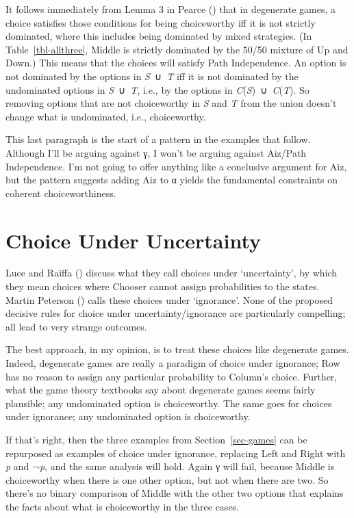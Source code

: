 \documentclass[
  11pt,
  letterpaper,
  DIV=11,
  numbers=noendperiod,
  twoside]{scrartcl}
\begin{document}
It follows immediately from Lemma 3 in Pearce
() that in degenerate games, a choice
satisfies those conditions for being choiceworthy iff it is not strictly
dominated, where this includes being dominated by mixed strategies. (In
Table~\ref{tbl-allthree}, Middle is strictly dominated by the 50/50
mixture of Up and Down.) This means that the choices will satisfy Path
Independence. An option is not dominated by the options in
\emph{S}~∪~\emph{T} iff it is not dominated by the undominated options
in \emph{S}~∪~\emph{T}, i.e., by the options in
\emph{C}(\emph{S})~∪~\emph{C}(\emph{T}). So removing options that are
not choiceworthy in \emph{S} and \emph{T} from the union doesn't change
what is undominated, i.e., choiceworthy.

This last paragraph is the start of a pattern in the examples that
follow. Although I'll be arguing against γ, I won't be arguing against
Aiz/Path Independence. I'm not going to offer anything like a conclusive
argument for Aiz, but the pattern suggests adding Aiz to α yields the
fundamental constraints on coherent choiceworthiness.

\section{Choice Under Uncertainty}\label{sec-uncertainty}

Luce and Raiffa () discuss what they
call choices under `uncertainty', by which they mean choices where
Chooser cannot assign probabilities to the states. Martin Peterson
() calls these choices under
`ignorance'. None of the proposed decisive rules for choice under
uncertainty/ignorance are particularly compelling; all lead to very
strange outcomes.

The best approach, in my opinion, is to treat these choices like
degenerate games. Indeed, degenerate games are really a paradigm of
choice under ignorance; Row has no reason to assign any particular
probability to Column's choice. Further, what the game theory textbooks
say about degenerate games seems fairly plausible; any undominated
option is choiceworthy. The same goes for choices under ignorance; any
undominated option is choiceworthy.

If that's right, then the three examples from Section~\ref{sec-games}
can be repurposed as examples of choice under ignorance, replacing Left
and Right with \emph{p} and ¬\emph{p}, and the same analysis will hold.
Again γ will fail, because Middle is choiceworthy when there is one
other option, but not when there are two. So there's no binary
comparison of Middle with the other two options that explains the facts
about what is choiceworthy in the three cases.
\end{document}
